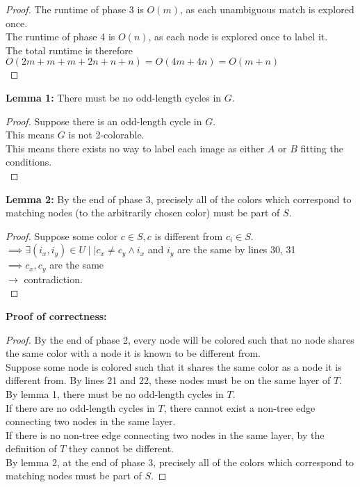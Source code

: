 \begin{problem}
\begin{proof}
    The runtime of phase 3 is $O(m)$, as each unambiguous match is explored once. \\
    The runtime of phase 4 is $O(n)$, as each node is explored once to label it. \\
    The total runtime is therefore $O(2m + m + m + 2n + n + n) = O(4m + 4n) = O(m + n)$ \\
  \end{proof}
  \textbf{Lemma 1:} There must be no odd-length cycles in $G$.
  \begin{proof}
    Suppose there is an odd-length cycle in $G$.\\
    This means $G$ is not 2-colorable. \\
    This means there exists no way to label each image as either $A$ or $B$ fitting the conditions. \\
  \end{proof}
  \textbf{Lemma 2:} By the end of phase 3, precisely all of the colors which correspond to matching nodes (to the arbitrarily chosen color) must be part of $S$.
  \begin{proof}
    Suppose some color $c \in S, c$ is different from $c_i \in S$. \\
    $\implies \exists (i_x, i_y) \in U \mid| c_x \ne c_y \land i_x$ and $i_y$ are the same by lines 30, 31 \\
    $\implies c_x, c_y$ are the same \\
    $\rightarrow$ contradiction. \\
  \end{proof}
  \textbf{Proof of correctness: }
  \begin{proof}
    By the end of phase 2, every node will be colored such that no node shares the same color with a node it is known to be different from. \\
    Suppose some node is colored such that it shares the same color as a node it is different from. By lines 21 and 22, these nodes must be on the same layer of $T$. \\
    By lemma 1, there must be no odd-length cycles in $T$. \\
    If there are no odd-length cycles in $T$, there cannot exist a non-tree edge connecting two nodes in the same layer. \\
    If there is no non-tree edge connecting two nodes in the same layer, by the definition of $T$ they cannot be different. \\
    By lemma 2, at the end of phase 3, precisely all of the colors which correspond to matching nodes must be part of $S$.

\end{proof}
\end{problem}

